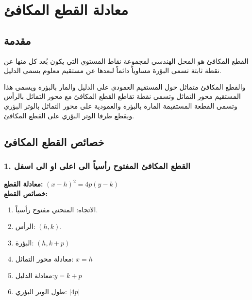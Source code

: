 \chapter{معادلة القطع المكافئ}

\section{مقدمة}

القطع المكافئ هو المحل الهندسي لمجموعة نقاط المستوي التي يكون بُعد كل منها عن نقطة ثابتة تسمى البؤرة مساوياً دائماً لبعدها عن مستقيم معلوم يسمى الدليل.

والقطع المكافئ متماثل حول المستقيم العمودي على الدليل والمار بالبؤرة ويسمى هذا المستقيم محور التماثل وتسمى نقطة تقاطع القطع المكافئ مع محور التماثل بالرأس وتسمى القطعة المستقيمة المارة بالبؤرة والعمودية على محور التماثل بالوتر البؤري ويقطع طرفا الوتر البؤري على القطع المكافئ.

\section{خصائص القطع المكافئ}

\subsection*{1. القطع المكافئ المفتوح رأسياً الى اعلى او الى اسفل}
\textbf{معادلة القطع:} \quad $(x-h)^2 = 4p(y-k)$\\[10pt]
\textbf{خصائص القطع:} 
\begin{enumerate}
	\item الاتجاه: \quad المنحني مفتوح رأسياً.
	\item الرأس: \quad $(h, k)$.
	\item البؤرة: \quad $(h, k+p)$
	\item معادلة محور التماثل:  \quad $x=h$
	\item معادلة الدليل:\quad $y=k+p$
	\item طول الوتر البؤري: \quad $|4p|$
\end{enumerate}

